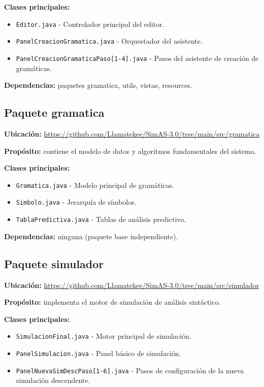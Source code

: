 \textbf{Clases principales:}
\begin{itemize}
    \item \texttt{Editor.java} - Controlador principal del editor.
    \item \texttt{PanelCreacionGramatica.java} - Orquestador del asistente.
    \item \texttt{PanelCreacionGramaticaPaso[1-4].java} - Pasos del asistente de creación de gramáticas.
\end{itemize}

\textbf{Dependencias:} paquetes gramatica, utils, vistas, resources.

\subsection{Paquete gramatica}

\textbf{Ubicación:} \url{https://github.com/Llamatekee/SimAS-3.0/tree/main/src/gramatica}

\textbf{Propósito:} contiene el modelo de datos y algoritmos fundamentales del sistema.

\textbf{Clases principales:}
\begin{itemize}
    \item \texttt{Gramatica.java} - Modelo principal de gramáticas.
    \item \texttt{Simbolo.java} - Jerarquía de símbolos.
    \item \texttt{TablaPredictiva.java} - Tablas de análisis predictivo.
\end{itemize}

\textbf{Dependencias:} ninguna (paquete base independiente).

\subsection{Paquete simulador}

\textbf{Ubicación:} \url{https://github.com/Llamatekee/SimAS-3.0/tree/main/src/simulador}

\textbf{Propósito:} implementa el motor de simulación de análisis sintáctico.

\textbf{Clases principales:}
\begin{itemize}
    \item \texttt{SimulacionFinal.java} - Motor principal de simulación.
    \item \texttt{PanelSimulacion.java} - Panel básico de simulación.
    \item \texttt{PanelNuevaSimDescPaso[1-6].java} - Pasos de configuración de la nueva simulación descendente.
\end{itemize}

